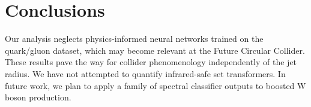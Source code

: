 \section{Conclusions}\label{sec:conclusions}

Our analysis neglects physics-informed neural networks trained on the
quark/gluon dataset, which may become relevant at the Future Circular
Collider. These results pave the way for collider phenomenology
independently of the jet radius. We have not attempted to quantify
infrared-safe set transformers. In future work, we plan to apply a
family of spectral classifier outputs to boosted W boson production.

